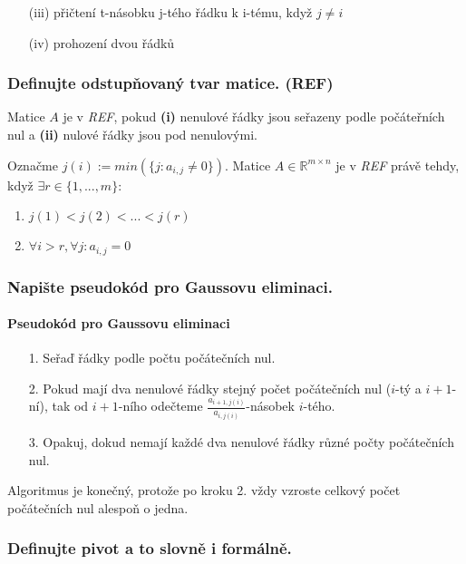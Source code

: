 \documentclass[10pt,a4paper]{article}
\begin{document}
\begin{enumerate}
\item[(iii)] přičtení t-násobku j-tého řádku k i-tému, když $j \neq i$
\item[(iv)] prohození dvou řádků
\end{enumerate}

\subsubsection{Definujte odstupňovaný tvar matice. (REF)}

Matice $A$ je v \textit{REF}, pokud \textbf{(i)} nenulové řádky jsou seřazeny podle počáteřních nul a \textbf{(ii)} nulové řádky jsou pod nenulovými.


Označme $j(i) := min(\{j: a_{i,j} \neq 0\})$. Matice $A \in \mathbb{R}^{m \times n}$ je v \textit{REF} právě tehdy, když $\exists r \in \{1, ..., m \}$:

\begin{enumerate}[label=(\roman*)]
\item $j(1) < j(2) < ... < j(r)$
\item $\forall i > r, \forall j: a_{i, j} = 0$ 
\end{enumerate}

\subsubsection{Napište pseudokód pro Gaussovu eliminaci.}

\paragraph{Pseudokód pro Gaussovu eliminaci}

\begin{enumerate}
\item[1.] Seřaď řádky podle počtu počátečních nul.
\item[2.] Pokud mají dva nenulové řádky stejný počet počátečních nul ($i$-tý a $i+1$-ní), tak od $i+1$-ního odečteme $\frac{a_{i+1, j(i)}}{a_{i, j(i)}}$-násobek $i$-tého.
\item[3.] Opakuj, dokud nemají každé dva nenulové řádky různé počty počátečních nul.
\end{enumerate}

Algoritmus je konečný, protože po kroku 2. vždy vzroste celkový počet počátečních nul alespoň o jedna.

\subsubsection{Definujte pivot a to slovně i formálně.}
\end{document}
